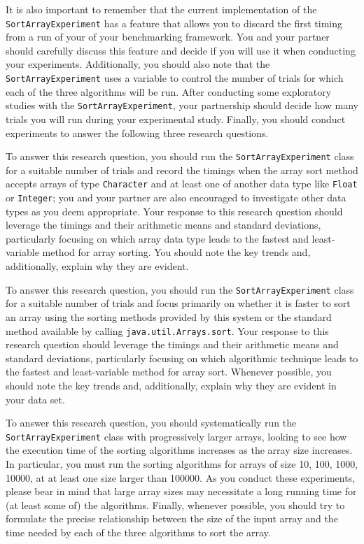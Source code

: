 It is also important to remember that the current implementation of the {\tt SortArrayExperiment} has a feature that
allows you to discard the first timing from a run of your of your benchmarking framework. You and your partner should
carefully discuss this feature and decide if you will use it when conducting your experiments. Additionally, you should
also note that the {\tt SortArrayExperiment} uses a variable to control the number of trials for which each of the three
algorithms will be run. After conducting some exploratory studies with the {\tt SortArrayExperiment}, your partnership
should decide how many trials you will run during your experimental study. Finally, you should conduct experiments to
answer the following three research questions.

 To
answer this research question, you should run the {\tt SortArrayExperiment} class for a suitable number of trials and
record the timings when the array sort method accepts arrays of type {\tt Character} and at least one of another data
type like {\tt Float} or {\tt Integer}; you and your partner are also encouraged to investigate other data types as you
deem appropriate. Your response to this research question should leverage the timings and their arithmetic means and
standard deviations, particularly focusing on which array data type leads to the fastest and least-variable method for
array sorting. You should note the key trends and, additionally, explain why they are evident.

 To answer this research question, you should run the {\tt SortArrayExperiment} class for a suitable number
of trials and focus primarily on whether it is faster to sort an array using the sorting methods provided by this system
or the standard method available by calling {\tt java.util.Arrays.sort}. Your response to this research question should
leverage the timings and their arithmetic means and standard deviations, particularly focusing on which algorithmic
technique leads to the fastest and least-variable method for array sort. Whenever possible, you should note the key
trends and, additionally, explain why they are evident in your data set.

 To answer this
research question, you should systematically run the {\tt SortArrayExperiment} class with progressively larger arrays,
looking to see how the execution time of the sorting algorithms increases as the array size increases. In particular,
you must run the sorting algorithms for arrays of size 10, 100, 1000, 10000, at at least one size larger than 100000. As
you conduct these experiments, please bear in mind that large array sizes may necessitate a long running time for (at
least some of) the algorithms. Finally, whenever possible, you should try to formulate the precise relationship between the size
of the input array and the time needed by each of the three algorithms to sort the array.

